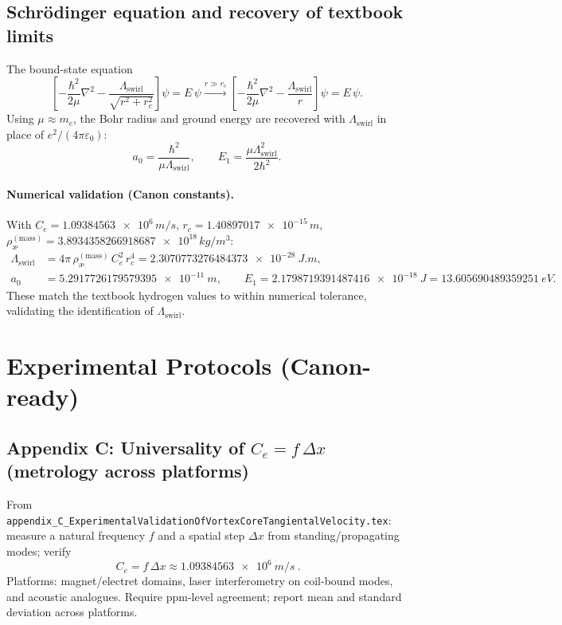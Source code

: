 \documentclass[11pt]{article}
\newcommand{\aeMass}{\rho_{\text{\ae}}^{(\text{mass})}}
\newcommand{\Ce}{C_e}
\newcommand{\rc}{r_c}
\newcommand{\Lam}{\Lambda_{\text{swirl}}}
\begin{document}
\subsection{Schr\"odinger equation and recovery of textbook limits \cite{Schrodinger1926,Jackson1999}}
The bound-state equation
\begin{equation}
  \left[-\frac{\hbar^2}{2\mu}\nabla^2 - \frac{\Lam}{\sqrt{r^2+\rc^2}}\right]\psi = E\,\psi \xrightarrow{r\gg \rc} \left[-\frac{\hbar^2}{2\mu}\nabla^2 - \frac{\Lam}{r}\right]\psi = E\,\psi . \tag{E3}
\end{equation}
Using \(\mu\approx m_e\), the Bohr radius and ground energy are recovered with \(\Lam\) in place of \(e^2/(4\pi\varepsilon_0)\):
\begin{equation}
  a_0=\frac{\hbar^2}{\mu \Lam},\qquad E_1=\frac{\mu \Lam^2}{2\hbar^2}. \tag{E4}
\end{equation}
\paragraph{Numerical validation (Canon constants).}
With \(\Ce=\num{1.09384563e6}\,\si{m/s}\), \(\rc=\num{1.40897017e-15}\,\si{m}\), \(\aeMass=\num{3.8934358266918687e18}\,\si{kg/m^3}\):
\begin{align}
  \Lam &= 4\pi\,\aeMass\,\Ce^2\,\rc^4 = \num{2.3070773276484373e-28}\ \si{J.m}, \tag{E5}\\
  a_0 &= \num{5.2917726179579395e-11}\ \si{m},\qquad
  E_1 = \num{2.1798719391487416e-18}\ \si{J} = \num{13.605690489359251}\ \si{eV}. \tag{E6}
\end{align}
These match the textbook hydrogen values to within numerical tolerance, validating the identification of \(\Lam\).

\section{Experimental Protocols (Canon-ready)}
\label{sec:experiments}
\subsection{Appendix C: Universality of \(\Ce=f\,\Delta x\) (metrology across platforms)}
From \texttt{appendix\_C\_ExperimentalValidationOfVortexCoreTangientalVelocity.tex}: measure a natural frequency \(f\) and a spatial step \(\Delta x\) from standing/propagating modes; verify
\begin{equation}
  \boxed{\ \Ce = f\,\Delta x \approx \num{1.09384563e6}\ \si{m/s}\ } . \tag{X1}
\end{equation}
Platforms: magnet/electret domains, laser interferometry on coil-bound modes, and acoustic analogues. Require ppm-level agreement; report mean and standard deviation across platforms.
\end{document}
